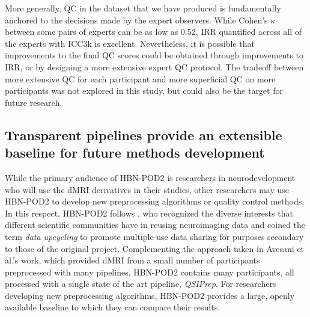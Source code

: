 \documentclass[9pt,lineno]{elife}
\begin{document}
More generally, QC in the dataset that we have produced is fundamentally
anchored to the decisions made by the expert observers. While Cohen's $\kappa$
between some pairs of experts can be as low as 0.52, IRR quantified across all
of the experts with ICC3k is excellent. Nevertheless, it is possible that
improvements to the final QC scores could be obtained through improvements to
IRR, or by designing a more extensive expert QC protocol. The tradeoff between
more extensive QC for each participant and more superficial QC on more participants was
not explored in this study, but could also be the target for future research.

\subsection{Transparent pipelines provide an extensible baseline for future methods development}

While the primary audience of HBN-POD2 is researchers in neurodevelopment who
will use the dMRI derivatives in their studies, other researchers may use
HBN-POD2 to develop new preprocessing algorithms or quality control methods. In
this respect, HBN-POD2 follows \cite{avesani2019-ey}, who
recognized the diverse interests that different scientific communities have in
reusing neuroimaging data and coined the term \emph{data upcycling} to promote
multiple-use data sharing for purposes secondary to those of the original
project. Complementing the approach taken in Avesani et al.'s work, which
provided dMRI from a small number of participants preprocessed with many pipelines,
HBN-POD2 contains many participants, all processed with a single state of the art
pipeline, \emph{QSIPrep}. For researchers developing new preprocessing
algorithms, HBN-POD2 provides a large, openly available baseline to which they
can compare their results.
\end{document}

